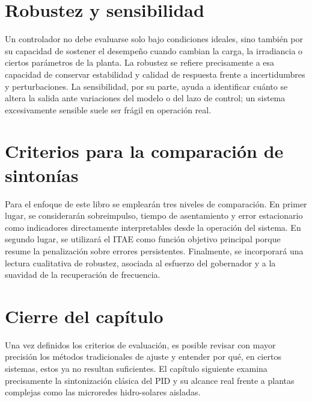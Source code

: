 \section{Robustez y sensibilidad}
Un controlador no debe evaluarse solo bajo condiciones ideales, sino también por su capacidad
de sostener el desempeño cuando cambian la carga, la irradiancia o ciertos parámetros de la
planta. La robustez se refiere precisamente a esa capacidad de conservar estabilidad y calidad
de respuesta frente a incertidumbres y perturbaciones. La sensibilidad, por su parte, ayuda a
identificar cuánto se altera la salida ante variaciones del modelo o del lazo de control; un
sistema excesivamente sensible suele ser frágil en operación real.

\section{Criterios para la comparación de sintonías}
Para el enfoque de este libro se emplearán tres niveles de comparación. En primer lugar, se
considerarán sobreimpulso, tiempo de asentamiento y error estacionario como indicadores
directamente interpretables desde la operación del sistema. En segundo lugar, se utilizará el
ITAE como función objetivo principal porque resume la penalización sobre errores persistentes.
Finalmente, se incorporará una lectura cualitativa de robustez, asociada al esfuerzo del
gobernador y a la suavidad de la recuperación de frecuencia.

\section{Cierre del capítulo}
Una vez definidos los criterios de evaluación, es posible revisar con mayor precisión los
métodos tradicionales de ajuste y entender por qué, en ciertos sistemas, estos ya no resultan
suficientes. El capítulo siguiente examina precisamente la sintonización clásica del PID y su
alcance real frente a plantas complejas como las microredes hidro-solares aisladas.
